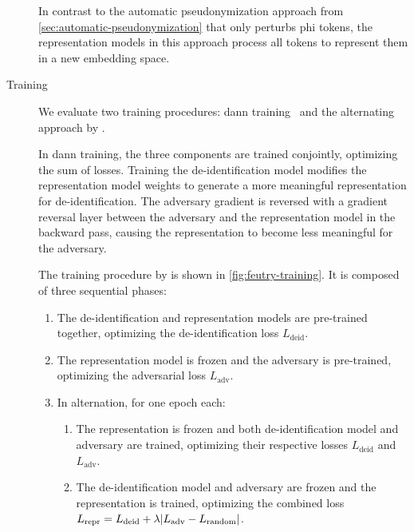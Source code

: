 \begin{description}
    In contrast to the automatic pseudonymization approach from \cref{sec:automatic-pseudonymization} that only perturbs \ac{phi} tokens, the representation models in this approach process all tokens to represent them in a new embedding space.
    
    
    \item[Training]
    We evaluate two training procedures: \ac{dann} training~\citep{ganin2016domain} and the alternating approach by \citet{feutry2018learning}.
    
    In \ac{dann} training, the three components are trained conjointly, optimizing the sum of losses.
    Training the de-identification model modifies the representation model weights to generate a more meaningful representation for de-identification.
    The adversary gradient is reversed with a gradient reversal layer between the adversary and the representation model in the backward pass, causing the representation to become less meaningful for the adversary.
    
    The training procedure by \citet{feutry2018learning} is shown in \cref{fig:feutry-training}.
    It is composed of three sequential phases:
    \begin{enumerate}
        \item The de-identification and representation models are pre-trained together, optimizing the de-identification loss $L_{\text{deid}}$.
        \item The representation model is frozen and the adversary is pre-trained, optimizing the adversarial loss $L_{\text{adv}}$.
        \item In alternation, for one epoch each:
        \begin{enumerate}
            \item The representation is frozen and both de-identification model and adversary are trained, optimizing their respective losses $L_{\text{deid}}$ and $L_{\text{adv}}$.
            \item The de-identification model and adversary are frozen and the representation is trained, optimizing the combined loss $L_{\text{repr}} = L_{\text{deid}} + \lambda \lvert L_{\text{adv}} - L_{\text{random}}\rvert$. \label{item:repr-training}
        \end{enumerate}
    \end{enumerate}
    

\end{description}
